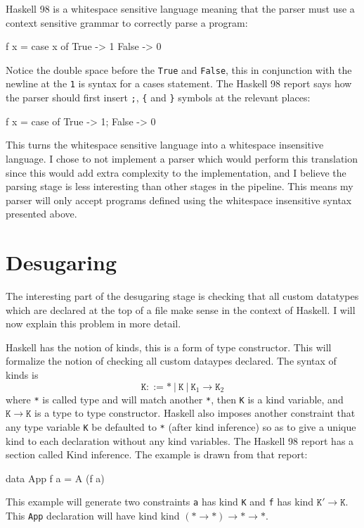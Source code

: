 \documentclass[float=false, crop=false]{standalone}
\begin{document}
Haskell 98 is a whitespace sensitive language meaning that the parser must use a
context sensitive grammar to correctly parse a program:
\begin{HaskellLst}
f x = case x of 
  True  -> 1
  False -> 0
\end{HaskellLst}
Notice the double space before the \texttt{True} and \texttt{False}, this in conjunction with the
newline at the \texttt{1} is syntax for a cases statement. The Haskell 98 report
says how the parser should first insert \texttt{;},  \texttt{\{} and \texttt{\}} symbols at the 
relevant places:
\begin{HaskellLst}
f x = case of {
  True  -> 1;
  False -> 0
}
\end{HaskellLst}
This turns the whitespace sensitive language into a whitespace insensitive language. I chose to 
not implement a parser which would perform this translation since this would add extra complexity to the
implementation, and I believe the parsing stage is less interesting than other stages in the pipeline.
This means my parser will only accept programs defined using the whitespace insensitive 
syntax presented above.


\section{Desugaring}

The interesting part of the desugaring stage is 
checking that all custom datatypes which are declared at the top of a
file make sense in the context of Haskell. I will now explain this
problem in more detail.

Haskell has the notion of kinds, this is a form of type constructor. This will
formalize the notion of checking all custom dataypes declared.
The syntax of kinds is
\[ \mathtt{K} ::= \mathtt{*}\ |\ \mathtt{K}\  |\ \mathtt{K}_1 \rightarrow \mathtt{K}_2 \] 
where \texttt{*} is called type and will match another
\texttt{*}, then \texttt{K} is a kind variable, and $\mathtt{K} \rightarrow \mathtt{K}$ is a type to type constructor.
Haskell also imposes another constraint that any type variable \texttt{K} 
be defaulted to \texttt{*} (after kind inference) so as to give a
unique kind to each declaration without any kind variables.
The Haskell 98 report has a section \cite[4.6]{haskell98-spec} called Kind inference.
The example is drawn from that report:
\begin{HaskellLst}
data App f a = A (f a)
\end{HaskellLst}
This example will generate two constraints \texttt{a} has kind \texttt{K} and \texttt{f} 
has kind $\mathtt{K'} \rightarrow \mathtt{K}$. This \texttt{App} declaration will have kind  
kind $(\mathtt{*}\rightarrow\mathtt{*})\rightarrow\mathtt{*}\rightarrow
\mathtt{*}$.
\end{document}
